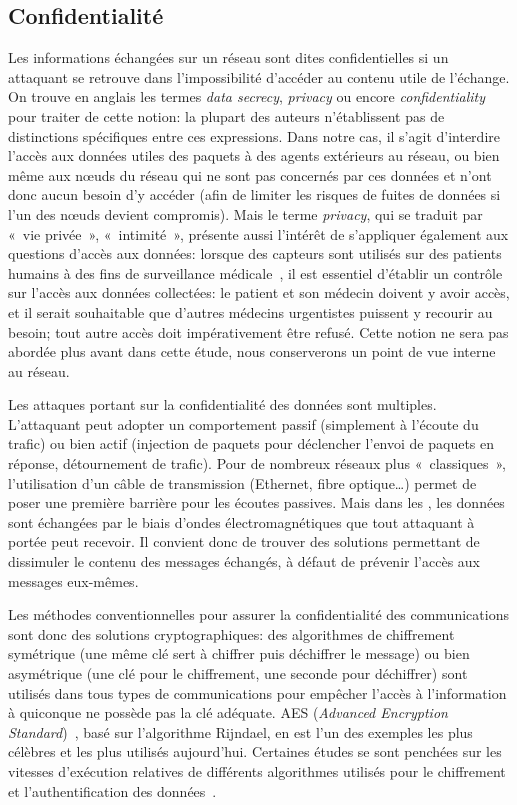 \subsection{Confidentialité}

Les informations échangées sur un réseau sont dites confidentielles si un attaquant se retrouve dans l'impossibilité d'accéder au contenu utile de l'échange.
On trouve en anglais les termes \textit{data secrecy}, \textit{privacy} ou encore \textit{confidentiality} pour traiter de cette notion: la plupart des auteurs n'établissent pas de distinctions spécifiques entre ces expressions.
Dans notre cas, il s'agit d'interdire l'accès aux données utiles des paquets à des agents extérieurs au réseau, ou bien même aux nœuds du réseau qui ne sont pas concernés par ces données et n'ont donc aucun besoin d'y accéder (afin de limiter les risques de fuites de données si l'un des nœuds devient compromis).
Mais le terme \textit{privacy}, qui se traduit par « vie privée », « intimité », présente aussi l'intérêt de s'appliquer également aux questions d'accès aux données: lorsque des capteurs sont utilisés sur des patients humains à des fins de surveillance médicale~\cite{SZFDXC14}, il est essentiel d'établir un contrôle sur l'accès aux données collectées: le patient et son médecin doivent y avoir accès, et il serait souhaitable que d'autres médecins urgentistes puissent y recourir au besoin; tout autre accès doit impérativement être refusé.
Cette notion ne sera pas abordée plus avant dans cette étude, nous conserverons un point de vue interne au réseau.

Les attaques portant sur la confidentialité des données sont multiples.
L'attaquant peut adopter un comportement passif (simplement à l'écoute du trafic) ou bien actif (injection de paquets pour déclencher l'envoi de paquets en réponse, détournement de trafic).
Pour de nombreux réseaux plus « classiques », l'utilisation d'un câble de transmission (Ethernet, fibre optique\dots) permet de poser une première barrière pour les écoutes passives.
Mais dans les \rcs, les données sont échangées par le biais d'ondes électromagnétiques que tout attaquant à portée peut recevoir.
Il convient donc de trouver des solutions permettant de dissimuler le contenu des messages échangés, à défaut de prévenir l'accès aux messages eux-mêmes.

Les méthodes conventionnelles pour assurer la confidentialité des communications sont donc des solutions cryptographiques: des algorithmes de chiffrement symétrique (une même clé sert à chiffrer puis déchiffrer le message) ou bien asymétrique (une clé pour le chiffrement, une seconde pour déchiffrer) sont utilisés dans tous types de communications pour empêcher l'accès à l'information à quiconque ne possède pas la clé adéquate.
AES (\textit{Advanced Encryption Standard})~\cite{aes}, basé sur l'algorithme Rijndael, en est l'un des exemples les plus célèbres et les plus utilisés aujourd'hui.
Certaines études se sont penchées sur les vitesses d'exécution relatives de différents algorithmes utilisés pour le chiffrement et l'authentification des données~\cite{SOBMCN11}.

